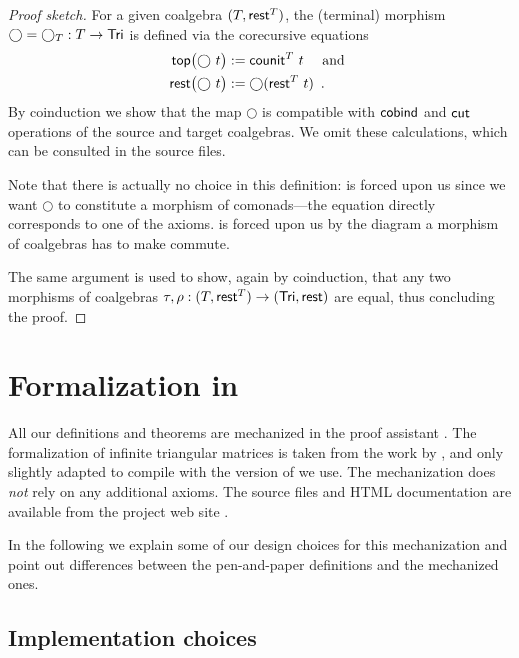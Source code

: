 \documentclass{amsart}
\begin{document}
\begin{proof}[Proof sketch]
   For a given coalgebra $(T,\mathsf{rest}^T)$, the (terminal) morphism $\bigcirc = \bigcirc_T:T\to\mathsf{Tri}$ is defined via the corecursive equations
    \begin{align}\mathsf{top}\bigl(\bigcirc~t\bigr) &:= \mathsf{counit}^T~t \quad\text{ and } \label{eq:terminal_top}\\
                     \mathsf{rest}\bigl(\bigcirc~t\bigr) &:= \bigcirc(\mathsf{rest}^T~t) \enspace . \label{eq:terminal_rest}
      \end{align}
      By coinduction we show that the map $\bigcirc$ is compatible with $\mathsf{cobind}$ and $\mathsf{cut}$ operations of the source and 
   target coalgebras. We omit these calculations, which can be consulted in the \coq source files.
   
   Note that there is actually no choice in this definition:  is forced upon us since we want $\bigcirc$ to constitute 
   a morphism of comonads---the equation directly corresponds to one of the axioms.
    is forced upon us by the diagram a morphism of coalgebras has to make commute.
   
   The same argument is used to show, again by coinduction, that any two morphisms of coalgebras $\tau,\rho : (T,\mathsf{rest}^T) \to (\mathsf{Tri},\mathsf{rest})$
   are equal, thus concluding the proof.
   
   
\end{proof}




\section{Formalization in \coq}\label{sec:formal}

All our definitions and theorems are mechanized in the proof assistant \coq \parencite{coq84pl3}.
The formalization of infinite triangular matrices is taken from the work by \textcite{DBLP:conf/types/MatthesP11},
and only slightly adapted to compile with the version of \coq we use.
The mechanization does \emph{not} rely on any additional axioms.
The \coq source files and HTML documentation are available from the project web site \parencite{trimat_coq}.

In the following we explain some of our design choices for this mechanization
and point out differences between the pen-and-paper definitions and the mechanized ones.



\subsection{Implementation choices}
\end{document}
